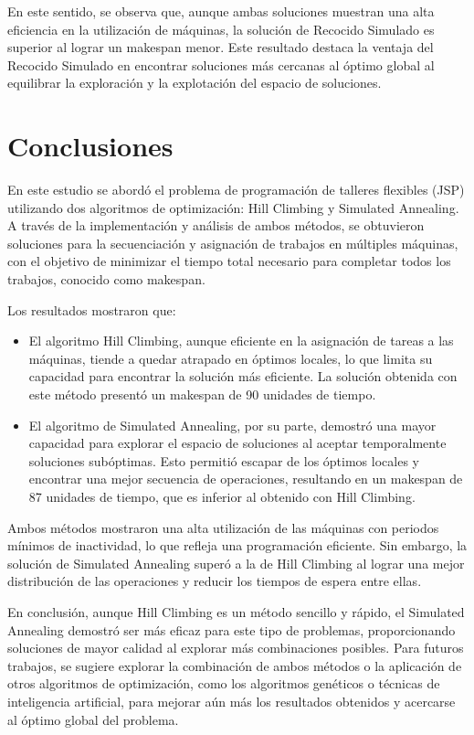 \documentclass[11pt]{article}
\begin{document}
En este sentido, se observa que, aunque ambas soluciones muestran una alta eficiencia en la utilización de máquinas, la solución de Recocido Simulado es superior al lograr un makespan menor. Este resultado destaca la ventaja del Recocido Simulado en encontrar soluciones más cercanas al óptimo global al equilibrar la exploración y la explotación del espacio de soluciones.

\section{Conclusiones}

En este estudio se abordó el problema de programación de talleres flexibles (JSP) utilizando dos algoritmos de optimización: Hill Climbing y Simulated Annealing. A través de la implementación y análisis de ambos métodos, se obtuvieron soluciones para la secuenciación y asignación de trabajos en múltiples máquinas, con el objetivo de minimizar el tiempo total necesario para completar todos los trabajos, conocido como makespan.

\vspace{1em}
\noindent Los resultados mostraron que:

\begin{itemize}
    \item El algoritmo Hill Climbing, aunque eficiente en la asignación de tareas a las máquinas, tiende a quedar atrapado en óptimos locales, lo que limita su capacidad para encontrar la solución más eficiente. La solución obtenida con este método presentó un makespan de 90 unidades de tiempo.
    \item El algoritmo de Simulated Annealing, por su parte, demostró una mayor capacidad para explorar el espacio de soluciones al aceptar temporalmente soluciones subóptimas. Esto permitió escapar de los óptimos locales y encontrar una mejor secuencia de operaciones, resultando en un makespan de 87 unidades de tiempo, que es inferior al obtenido con Hill Climbing.
\end{itemize}

\noindent Ambos métodos mostraron una alta utilización de las máquinas con periodos mínimos de inactividad, lo que refleja una programación eficiente. Sin embargo, la solución de Simulated Annealing superó a la de Hill Climbing al lograr una mejor distribución de las operaciones y reducir los tiempos de espera entre ellas.

\vspace{1em}
\noindent En conclusión, aunque Hill Climbing es un método sencillo y rápido, el Simulated Annealing demostró ser más eficaz para este tipo de problemas, proporcionando soluciones de mayor calidad al explorar más combinaciones posibles. Para futuros trabajos, se sugiere explorar la combinación de ambos métodos o la aplicación de otros algoritmos de optimización, como los algoritmos genéticos o técnicas de inteligencia artificial, para mejorar aún más los resultados obtenidos y acercarse al óptimo global del problema.



 

\end{document}
